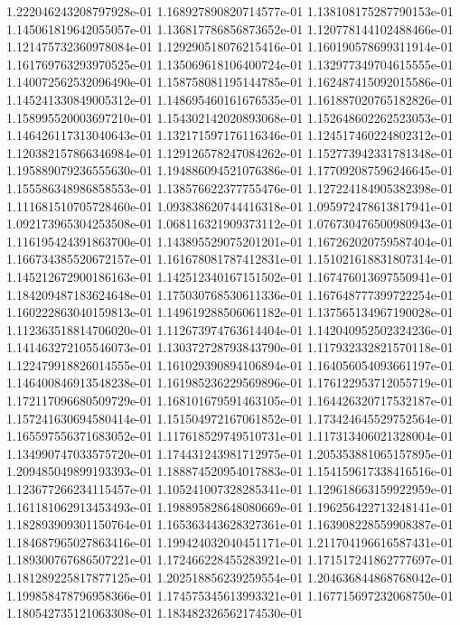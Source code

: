 1.222046243208797928e-01
1.168927890820714577e-01
1.138108175287790153e-01
1.145061819642055057e-01
1.136817786856873652e-01
1.120778144102488466e-01
1.121475732360978084e-01
1.129290518076215416e-01
1.160190578699311914e-01
1.161769763293970525e-01
1.135069618106400724e-01
1.132977349704615555e-01
1.140072562532096490e-01
1.158758081195144785e-01
1.162487415092015586e-01
1.145241330849005312e-01
1.148695460161676535e-01
1.161887020765182826e-01
1.158995520003697210e-01
1.154302142020893068e-01
1.152648602262523053e-01
1.146426117313040643e-01
1.132171597176116346e-01
1.124517460224802312e-01
1.120382157866346984e-01
1.129126578247084262e-01
1.152773942331781348e-01
1.195889079236555630e-01
1.194886094521076386e-01
1.177092087596246645e-01
1.155586348986858553e-01
1.138576622377755476e-01
1.127224184905382398e-01
1.111681510705728460e-01
1.093838620744416318e-01
1.095972478613817941e-01
1.092173965304253508e-01
1.068116321909373112e-01
1.076730476500980943e-01
1.116195424391863700e-01
1.143895529075201201e-01
1.167262020759587404e-01
1.166734385520672157e-01
1.161678081787412831e-01
1.151021618831807314e-01
1.145212672900186163e-01
1.142512340167151502e-01
1.167476013697550941e-01
1.184209487183624648e-01
1.175030768530611336e-01
1.167648777399722254e-01
1.160222863040159813e-01
1.149619288506061182e-01
1.137565134967190028e-01
1.112363518814706020e-01
1.112673974763614404e-01
1.142040952502324236e-01
1.141463272105546073e-01
1.130372728793843790e-01
1.117932332821570118e-01
1.122479918826014555e-01
1.161029390894106894e-01
1.164056054093661197e-01
1.146400846913548238e-01
1.161985236229569896e-01
1.176122953712055719e-01
1.172117096680509729e-01
1.168101679591463105e-01
1.164426320717532187e-01
1.157241630694580414e-01
1.151504972167061852e-01
1.173424645529752564e-01
1.165597556371683052e-01
1.117618529749510731e-01
1.117313406021328004e-01
1.134990747033575720e-01
1.174431243981712975e-01
1.205353881065157895e-01
1.209485049899193393e-01
1.188874520954017883e-01
1.154159617338416516e-01
1.123677266234115457e-01
1.105241007328285341e-01
1.129618663159922959e-01
1.161181062913453493e-01
1.198895828648080669e-01
1.196256422713248141e-01
1.182893909301150764e-01
1.165363443628327361e-01
1.163908228559908387e-01
1.184687965027863416e-01
1.199424032040451171e-01
1.211704196616587431e-01
1.189300767686507221e-01
1.172466228455283921e-01
1.171517241862777697e-01
1.181289225817877125e-01
1.202518856239259554e-01
1.204636844868768042e-01
1.199858478796958366e-01
1.174575345613993321e-01
1.167715697232068750e-01
1.180542735121063308e-01
1.183482326562174530e-01
